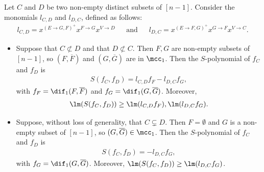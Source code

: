 \begin{lemma}\label{s-poly}
Let $C$ and $D$ be two non-empty distinct subsets of $[n-1]$. Consider
the monomials $l_{C,D}$ and $l_{D,C}$, defined as follows:
\begin{eqnarray*}
l_{C,D}=x^{(E\to G,F)^{+}}x^{F\to G}x^{V\to D}\phantom{+}\mbox{ and }\phantom{+}
l_{D,C}=x^{(E\to F,G)^{+}}x^{G\to F}x^{V\to C}.
\end{eqnarray*}
\begin{itemize}
\item[$(a)$] Suppose that $C\not\subset D$ and that $D\not\subset
  C$. Then $F,G$ are non-empty subsets of $[n-1]$, so
  $(F,\overline{F})$ and $(G,\overline{G})$ are in $\mcc_1$. Then the
  $S$-polynomial of $f_C$ and $f_D$ is
\begin{eqnarray}\label{sfcfd}
S(f_C,f_D)=l_{C,D}f_F-l_{D,C}f_G,
\end{eqnarray}
with $f_F=\dif_1(F,\overline{F})$ and
$f_G=\dif_1(G,\overline{G})$. Moreover,
\begin{eqnarray*}
\lm(S(f_C,f_D))\geq\lm(l_{C,D}f_F),\lm(l_{D,C}f_G).
\end{eqnarray*}
\item[$(b)$] Suppose, without loss of generality, that $C\subsetneq
  D$. Then $F=\emptyset$ and $G$ is a non-empty subset of $[n-1]$, so
  $(G,\overline{G})\in\mcc_1$. Then the $S$-polynomial of $f_C$ and
  $f_D$ is
\begin{eqnarray}\label{sfcfd0}
S(f_C,f_D)=-l_{D,C}f_G, 
\end{eqnarray}
with $f_G=\dif_1(G,\overline{G})$.  Moreover,
$\lm(S(f_C,f_D))\geq\lm(l_{D,C}f_G)$.
\end{itemize}
\end{lemma}
